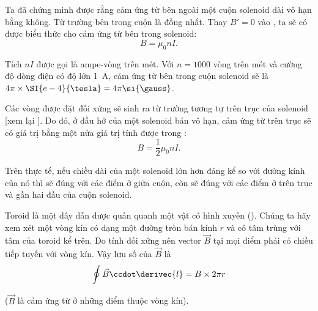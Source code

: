 Ta đã chứng minh được rằng cảm ứng từ bên ngoài một cuộn solenoid dài vô hạn bằng không. Từ trường bên trong cuộn là đồng nhất. Thay $B' = 0$ vào , ta sẽ có được biểu thức cho cảm ứng từ bên trong solenoid:
\begin{equation}\label{eq:6_108}
    B = \mu_0 n I.
\end{equation}

Tích $nI$ được gọi là ampe-vòng trên mét. Với $n = 1000$ vòng trên mét và cường độ dòng điện có độ lớn \SI{1}{\ampere}, cảm ứng từ bên trong cuộn solenoid sẽ là $4\pi\times\SI{e-4}{\tesla}=4\pi \si{\gauss}$.

Các vòng được đặt đối xứng sẽ sinh ra từ trường tương tự trên trục của solenoid [xem lại ]. Do đó, ở đầu hở của một solenoid bán vô hạn, cảm ứng từ trên trục sẽ có giá trị bằng một nửa giá trị tính được trong :
\begin{equation}\label{eq:6_109}
    B = \frac{1}{2} \mu_0 n I.
\end{equation}

Trên thực tế, nếu chiều dài của một solenoid lớn hơn đáng kể so với đường kính của nó thì  sẽ đúng với các điểm ở giữa cuộn, còn  sẽ đúng với các điểm ở trên trục và gần hai đầu của cuộn solenoid.

Toroid là một dây dẫn được quấn quanh một vật có hình xuyến (). Chúng ta hãy xem xét một vòng kín có dạng một đường tròn bán kính $r$ và có tâm trùng với tâm của toroid kể trên. Do tính đối xứng nên vector $\vec{B}$ tại mọi điểm phải có chiều tiếp tuyến với vòng kín. Vậy lưu số của $\vec{B}$ là
\begin{equation*}
    \oint \vec{B} \ccdot \derivec{l} = B \times 2\pi r
\end{equation*}

\noindent
($\vec{B}$ là cảm ứng từ ở những điểm thuộc vòng kín).

